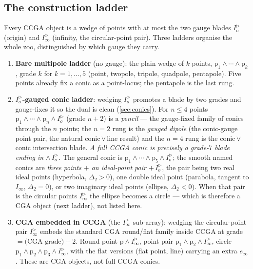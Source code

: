 \documentclass{birkjour}
\theoremstyle{definition}
\theoremstyle{remark}
\newcommand{\einf}{e_\infty}
\newcommand{\Iod}{I_o^{\triangleright}}      %
\newcommand{\Iinfd}{I_\infty^{\triangleright}}%
\newcommand{\Iinf}{I_\infty}
\newcommand{\meet}{\vee}
\newcommand{\joinp}{\wedge}
\begin{document}
\subsection{The construction ladder}

Every CCGA object is a wedge of points with at most the two gauge blades $\Iod$
(origin) and $\Iinfd$ (infinity, the circular-point pair). Three ladders organise
the whole zoo, distinguished by which gauge they carry.

\begin{enumerate}
\item \textbf{Bare multipole ladder} (no gauge): the plain wedge of $k$ points,
  $\mathrm{p}_1\joinp\cdots\joinp\mathrm{p}_k$, grade $k$ for $k=1,\dots,5$
  (point, twopole, tripole, quadpole, pentapole). Five points already fix a conic
  as a point-locus; the pentapole is the last rung.
\item \textbf{$\Iod$-gauged conic ladder}: wedging $\Iod$ promotes a blade by two
  grades and gauge-fixes it so the dual is clean (\cref{sec:conics}). For $n\le 4$
  points $\mathrm{p}_1\joinp\cdots\joinp\mathrm{p}_n\joinp\Iod$ (grade $n+2$) is a
  \emph{pencil} --- the gauge-fixed family of conics through the $n$ points; the
  $n=2$ rung is the \emph{gauged dipole} (the conic-gauge point pair, the natural
  conic\,$\meet$\,line result) and the $n=4$ rung is the conic\,$\meet$\,conic
  intersection blade. \emph{A full CCGA conic is precisely a grade-$7$ blade ending
  in $\joinp\,\Iod$.} The general conic is
  $\mathrm{p}_1\joinp\cdots\joinp\mathrm{p}_5\joinp\Iod$; the smooth named conics are
  \emph{three points $+$ an ideal-point pair $+\,\Iod$}, the pair being two real
  ideal points (hyperbola, $\Delta_2>0$), one double ideal point (parabola, tangent
  to $\Iinf$, $\Delta_2=0$), or two imaginary ideal points (ellipse, $\Delta_2<0$).
  When that pair is the circular points $\Iinfd$ the ellipse becomes a circle ---
  which is therefore a CGA object (next ladder), not listed here.
\item \textbf{CGA embedded in CCGA} (the $\Iinfd$ sub-array): wedging the
  circular-point pair $\Iinfd$ embeds the standard CGA round/flat family inside CCGA
  at grade $=\text{(CGA grade)}+2$. Round point $\mathrm{p}\joinp\Iinfd$, point pair
  $\mathrm{p}_1\joinp\mathrm{p}_2\joinp\Iinfd$, circle
  $\mathrm{p}_1\joinp\mathrm{p}_2\joinp\mathrm{p}_3\joinp\Iinfd$, with the flat
  versions (flat point, line) carrying an extra $\einf$. These are CGA objects, not
  full CCGA conics.
\end{enumerate}
\end{document}
